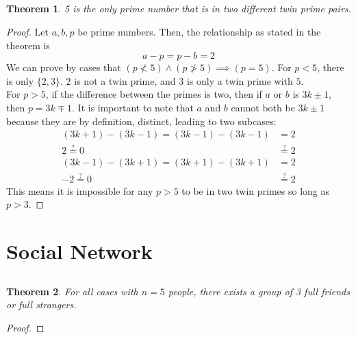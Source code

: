 \documentclass{article}
\newtheorem{theorem}{Theorem}
\begin{document}
\subsection{}

\begin{theorem}
    5 is the only prime number that is in two different twin prime pairs.
\end{theorem}
\begin{proof}
    Let \(a, b, p\) be prime numbers.
    Then, the relationship as stated in the theorem is
    \begin{equation}
        a - p = p - b = 2
    \end{equation}
    We can prove by cases that \((p \nless 5) \land (p \ngtr 5) \implies (p = 5)\).
    For \(p < 5\), there is only \(\{2, 3\}\).
    \(2\) is not a twin prime, and \(3\) is only a twin prime with \(5\). \\
    For \(p > 5\), if the difference between the primes is two, then if \(a\) or \(b\) is \(3k \pm 1\), then \(p = 3k \mp 1\).
    It is important to note that \(a\) and \(b\) cannot both be \(3k \pm 1\) because they are by definition, distinct, leading to two subcases:
    \begin{align}
        (3k + 1) - (3k - 1) = (3k - 1) - (3k - 1) &= 2 \\
        2 \overset{?}{=} 0 &\overset{?}{=} 2 \\
        (3k - 1) - (3k + 1) = (3k + 1) - (3k + 1) &= 2 \\
        -2 \overset{?}{=} 0 &\overset{?}{=} 2
    \end{align}
    This means it is impossible for any \(p > 5\) to be in two twin primes so long as \(p > 3\).
\end{proof}

\section{Social Network}

\subsection{}

\begin{theorem}
    For all cases with \(n = 5\) people, there exists a group of 3 full friends or full strangers.
\end{theorem}
\begin{proof}

\end{proof}
\end{document}
